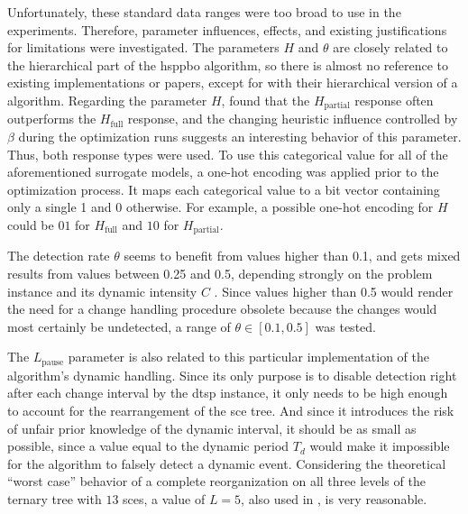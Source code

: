 Unfortunately, these standard data ranges were too broad to use in the experiments. Therefore, parameter influences, effects, and existing justifications for limitations were investigated.
The parameters $H$ and $\theta$ are closely related to the hierarchical part of the \gls{hsppbo} algorithm, so there is almost no reference to existing implementations or papers, except for \citet{janson2006hierarchical} with their hierarchical version of a  algorithm. Regarding the parameter $H$, \citet{kupfer2021hierarchical} found that the $H_{\text{partial}}$ response often outperforms the $H_{\text{full}}$ response, and the changing heuristic influence controlled by $\beta$ during the optimization runs suggests an interesting behavior of this parameter. Thus, both response types were used. To use this categorical value for all of the aforementioned surrogate models, a one-hot encoding was applied prior to the optimization process. It maps each categorical value to a bit vector containing only a single 1 and 0 otherwise. For example, a possible one-hot encoding for $H$ could be $01$ for $H_{\text{full}}$ and $10$ for $H_{\text{partial}}$.

The detection rate $\theta$ seems to benefit from values higher than 0.1, and gets mixed results from values between 0.25 and 0.5, depending strongly on the problem instance and its dynamic intensity $C$ \cite{kupfer2021hierarchical}. Since values higher than 0.5 would render the need for a change handling procedure obsolete because the changes would most certainly be undetected, a range of $\theta \in [0.1, 0.5]$ was tested. 

The $L_\text{pause}$ parameter is also related to this particular implementation of the algorithm's dynamic handling. Since its only purpose is to disable detection right after each change interval by the \gls{dtsp} instance, it only needs to be high enough to account for the rearrangement of the \gls{sce} tree. And since it introduces the risk of unfair prior knowledge of the dynamic interval, it should be as small as possible, since a value equal to the dynamic period $T_{d}$ would make it impossible for the algorithm to falsely detect a dynamic event. Considering the theoretical \enquote{worst case} behavior of a complete reorganization on all three levels of the ternary tree with $13$ \glspl{sce}, a value of $L = 5$, also used in \cite{kupfer2021hierarchical}, is very reasonable.

